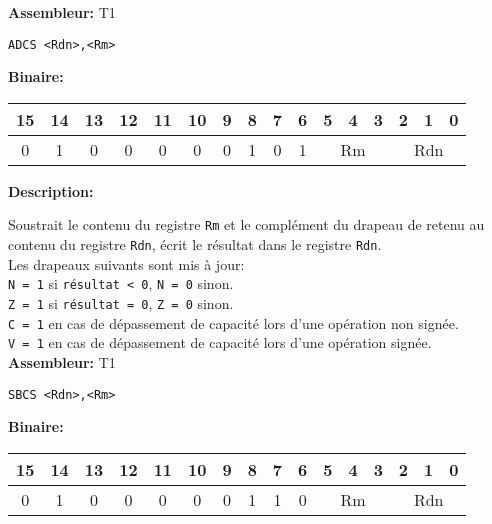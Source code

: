 \documentclass{article}
\begin{document}
    \textbf{Assembleur:} T1

    \begin{lstlisting}
ADCS <Rdn>,<Rm>
    \end{lstlisting}

    \textbf{Binaire:}\\

    \begin{tabular}{| c c c c c c c c c c c c c c c c |}
        \hline
        15 & 14 & 13 & 12 & 11 & 10 & \multicolumn{1}{|c}{9} & 8 & 7 & 6 & \multicolumn{1}{|c}{5} & 4 & 3 & \multicolumn{1}{|c}{2} & 1 & 0 \\
        \hline
        0 & 1 & 0 & 0 & 0 & 0 & \multicolumn{1}{|c}{0} & 1 & 0 & 1 & \multicolumn{3}{|c}{Rm} & \multicolumn{3}{|c|}{Rdn} \\
        \hline
    \end{tabular}

    \label{subsubsubsec:SBC}

    \textbf{Description: }

    Soustrait le contenu du registre \texttt{Rm} et le complément du drapeau de retenu au contenu du registre \texttt{Rdn}, écrit le résultat dans le registre \texttt{Rdn}.\\
    Les drapeaux suivants sont mis à jour:\\
    \texttt{N = 1} si \texttt{résultat < 0}, \texttt{N = 0} sinon.\\
    \texttt{Z = 1} si \texttt{résultat = 0}, \texttt{Z = 0} sinon.\\
    \texttt{C = 1} en cas de dépassement de capacité lors d'une opération non signée.\\
    \texttt{V = 1} en cas de dépassement de capacité lors d'une opération signée.\\

    \textbf{Assembleur:} T1

    \begin{lstlisting}
SBCS <Rdn>,<Rm>
    \end{lstlisting}

    \textbf{Binaire:}\\

    \begin{tabular}{| c c c c c c c c c c c c c c c c |}
        \hline
        15 & 14 & 13 & 12 & 11 & 10 & \multicolumn{1}{|c}{9} & 8 & 7 & 6 & \multicolumn{1}{|c}{5} & 4 & 3 & \multicolumn{1}{|c}{2} & 1 & 0 \\
        \hline
        0 & 1 & 0 & 0 & 0 & 0 & \multicolumn{1}{|c}{0} & 1 & 1 & 0 & \multicolumn{3}{|c}{Rm} & \multicolumn{3}{|c|}{Rdn} \\
        \hline
    \end{tabular}
\end{document}
